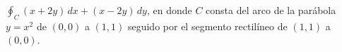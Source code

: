 \item $\oint_C (x + 2y) \, dx + (x - 2y) \, dy$, en donde $C$ consta del arco de la parábola $y = x^2$ de $(0, 0)$ a $(1, 1)$ seguido por el segmento rectilíneo de $(1, 1)$ a $(0, 0)$.
